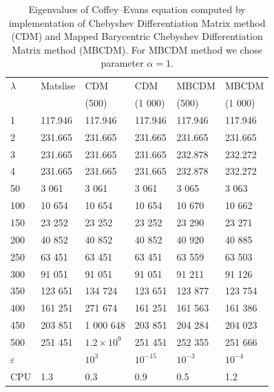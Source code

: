 \documentclass[11pt,a4paper,oneside,openright]{report} %
\begin{document}
\begin{table}[H]
\centering
\caption{Eigenvalues of Coffey--Evans equation computed by implementation of Chebyshev Differentiation Matrix method (CDM) and Mapped Barycentric Chebyshev Differentiation Matrix method (MBCDM). For MBCDM method we chose parameter $\alpha = 1$.}
\label{}
{\small
\begin{tabularx}{\textwidth}{l *{5}{X}}
\toprule
$\lambda$ & Matslise & CDM   & CDM  & MBCDM  & MBCDM  \\
 &  & (500)  & (1 000) & (500) & (1 000) \\
\midrule
1 & 117.946 & 117.946 & 117.946 & 117.946  &  117.946 \\
2 & 231.665 & 231.665 & 231.665 & 231.665 & 231.665 \\
3 & 231.665 & 231.665 & 231.665 & 232.878 & 232.272 \\
4 & 231.665 & 231.665 & 231.665 & 232.878 & 232.272 \\
50 & 3 061 & 3 061 & 3 061 & 3 065 & 3 063 \\
100 & 10 654 & 10 654 & 10 654 & 10 670 &  10 662\\
150 & 23 252 & 23 252 & 23 252 & 23 290 & 23 271 \\
200 & 40 852 & 40 852 & 40 852 & 40 920 & 40 885 \\
250 & 63 451 & 63 451 & 63 451 & 63 559 &  63 503 \\
300 & 91 051 & 91 051 & 91 051 & 91 211 & 91 126 \\
350 & 123 651 & 134 724 & 123 651 & 123 877 & 123 754 \\
400 & 161 251 & 271 674 & 161 251 & 161 563 & 161 386 \\
450 & 203 851 & 1 000 648 & 203 851 & 204 284 & 204 023 \\
500 & 251 451 & $1.2 \times 10^{9}$ & 251 451 & 252 355 &  251 666\\
\midrule
$\varepsilon$ &  & $10^{3}$ & $10^{-15}$ & $10^{-3}$ & $10^{-4}$ \\
CPU & 1.3 & 0.3 & 0.9 & 0.5 & 1.2 \\
\bottomrule
\end{tabularx}
}
\end{table}
\end{document}
